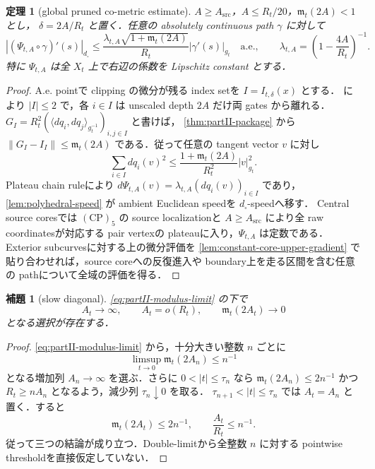 \documentclass[a4paper,11pt]{ltjsarticle}
\numberwithin{equation}{section}
\theoremstyle{plain}
\newtheorem{theorem}{定理}[section]
\newtheorem{lemma}[lemma]{補題}
\theoremstyle{definition}
\theoremstyle{remark}
\begin{document}
\begin{theorem}[global pruned co-metric estimate]\label{thm:global-pruned-cometric}
$A\ge A_{\mathrm{src}}$，$A\le R_t/20$，$\mathfrak m_t(2A)<1$ とし，
$\delta=2A/R_t$ と置く．任意の absolutely continuous path $\gamma$ に対して
\begin{equation}\label{eq:pruned-speed}
 \left|(\Psi_{t,A}\circ\gamma)'(s)\right|_{d_\square}
 \le
 \frac{\lambda_{t,A}\sqrt{1+\mathfrak m_t(2A)}}{R_t}
 |\gamma'(s)|_{g_t}
 \quad\text{a.e.},
 \qquad
 \lambda_{t,A}=\left(1-\frac{4A}{R_t}\right)^{-1}.
\end{equation}
特に $\Psi_{t,A}$ は全 $X_t$ 上で右辺の係数を Lipschitz constant とする．
\end{theorem}

\begin{proof}
A.e. pointで clipping の微分が残る index setを $I=I_{t,\delta}(x)$ とする．
 により $|I|\le2$ で，各 $i\in I$ は unscaled depth $2A$ だけ両 gates から離れる．
$G_I=R_t^2(\langle dq_i,dq_j\rangle_{g_t^{-1}})_{i,j\in I}$ と書けば，
\cref{thm:partII-package} から $\|G_I-I_I\|\le\mathfrak m_t(2A)$ である．従って任意の tangent vector $v$ に対し
\[
 \sum_{i\in I}dq_i(v)^2
 \le\frac{1+\mathfrak m_t(2A)}{R_t^2}|v|_{g_t}^2.
\]
Plateau chain ruleにより $d\Psi_{t,A}(v)=\lambda_{t,A}(dq_i(v))_{i\in I}$ であり，
\cref{lem:polyhedral-speed} が ambient Euclidean speedを $d_\square$-speedへ移す．
Central source coresでは $\mathrm{(CP)}_5$ の source localizationと $A\ge A_{\mathrm{src}}$ により全 raw coordinatesが対応する pair vertexの plateauに入り，$\Psi_{t,A}$ は定数である．Exterior subcurvesに対する上の微分評価を \cref{lem:constant-core-upper-gradient} で貼り合わせれば，source coreへの反復進入や boundary上を走る区間を含む任意の pathについて全域の評価を得る．
\end{proof}

\begin{lemma}[slow diagonal]\label{lem:flagged-diagonal}
\cref{eq:partII-modulus-limit} の下で
\[
 A_t\longrightarrow\infty,
 \qquad A_t=o(R_t),
 \qquad \mathfrak m_t(2A_t)\longrightarrow0
\]
となる選択が存在する．
\end{lemma}

\begin{proof}
\eqref{eq:partII-modulus-limit} から，十分大きい整数 $n$ ごとに
\[
 \limsup_{t\to0}\mathfrak m_t(2A_n)\le n^{-1}
\]
となる増加列 $A_n\to\infty$ を選ぶ．さらに $0<|t|\le\tau_n$ なら
$\mathfrak m_t(2A_n)\le2n^{-1}$ かつ $R_t\ge nA_n$ となるよう，減少列 $\tau_n\downarrow0$ を取る．
$\tau_{n+1}<|t|\le\tau_n$ では $A_t=A_n$ と置く．すると
\[
 \mathfrak m_t(2A_t)\le2n^{-1},
 \qquad
 \frac{A_t}{R_t}\le n^{-1}.
\]
従って三つの結論が成り立つ．Double-limitから全整数 $n$ に対する pointwise thresholdを直接仮定していない．
\end{proof}
\end{document}

